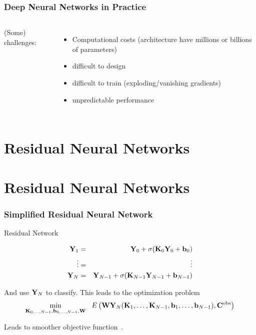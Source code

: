 \documentclass[12pt,fleqn,handout]{beamer}
\begin{document}
\begin{frame}[fragile]\frametitle{Deep Neural Networks in Practice}

\begin{columns}
(Some) challenges:
\begin{itemize}
\item
Computational costs (architecture have millions or billions of parameters)
\item
difficult to design
\item
difficult to train (exploding/vanishing gradients)
\item
unpredictable performance
\end{itemize}

\bigskip
{}
	
\end{columns}


\end{frame}





\section{Residual Neural Networks} %
\label{sec:residual_neural_networks}

\section{Residual Neural Networks} %
\label{sec:residual_neural_networks}

\begin{frame}[fragile]\frametitle{Simplified Residual Neural Network}

Residual Network

\bigskip

\begin{eqnarray*}
{\bf Y}_1 &=& {\bf Y}_0 + \sigma({\bf K}_0{\bf Y}_0 + {\bf b}_0) \\
\vdots &=&  \vdots \\
 {\bf Y}_N &=& {\bf Y}_{N-1} + \sigma( {\bf K}_{N-1}{\bf Y}_{N-1} + {\bf b}_{N-1})
 \end{eqnarray*}

And use ${\bf Y}_N$ to classify. This leads to the optimization problem
$$ 
\min_{{\bf K}_{0,\ldots,N-1},{\bf b}_{0,\ldots,N-1},{\bf W}} \ \ E\left({\bf W}{\bf Y}_N({\bf K}_1,\ldots,{\bf K}_{N-1},{\bf b}_1,\ldots, {\bf b}_{N-1}), {\bf C}^{\rm obs} \right)
 $$

\bigskip
\begin{center}
	Leads to smoother objective function~\cite{LiEtAl2017}. 
	\end{center}

\end{frame}
\end{document}
